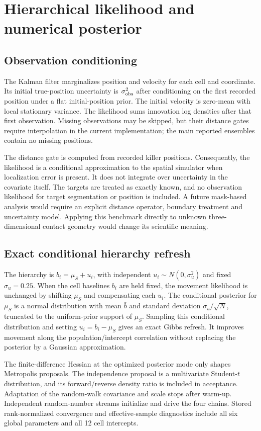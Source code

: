 \documentclass[11pt]{article}
\begin{document}
\section{Hierarchical likelihood and numerical posterior}
\subsection{Observation conditioning}
The Kalman filter marginalizes position and velocity for each cell and coordinate. Its initial true-position uncertainty is $\sigma_{\rm obs}^2$ after conditioning on the first recorded position under a flat initial-position prior. The initial velocity is zero-mean with local stationary variance. The likelihood sums innovation log densities after that first observation. Missing observations may be skipped, but their distance gates require interpolation in the current implementation; the main reported ensembles contain no missing positions.

The distance gate is computed from recorded killer positions. Consequently, the likelihood is a conditional approximation to the spatial simulator when localization error is present. It does not integrate over uncertainty in the covariate itself. The targets are treated as exactly known, and no observation likelihood for target segmentation or position is included. A future mask-based analysis would require an explicit distance operator, boundary treatment and uncertainty model. Applying this benchmark directly to unknown three-dimensional contact geometry would change its scientific meaning.

\subsection{Exact conditional hierarchy refresh}
The hierarchy is $b_i=\mu_S+u_i$, with independent $u_i\sim N(0,\sigma_u^2)$ and fixed $\sigma_u=0.25$. When the cell baselines $b_i$ are held fixed, the movement likelihood is unchanged by shifting $\mu_S$ and compensating each $u_i$. The conditional posterior for $\mu_S$ is a normal distribution with mean $\bar b$ and standard deviation $\sigma_u/\sqrt{N}$, truncated to the uniform-prior support of $\mu_S$. Sampling this conditional distribution and setting $u_i=b_i-\mu_S$ gives an exact Gibbs refresh. It improves movement along the population/intercept correlation without replacing the posterior by a Gaussian approximation.

The finite-difference Hessian at the optimized posterior mode only shapes Metropolis proposals. The independence proposal is a multivariate Student-$t$ distribution, and its forward/reverse density ratio is included in acceptance. Adaptation of the random-walk covariance and scale stops after warm-up. Independent random-number streams initialize and drive the four chains. Stored rank-normalized convergence and effective-sample diagnostics include all six global parameters and all 12 cell intercepts.
\end{document}
